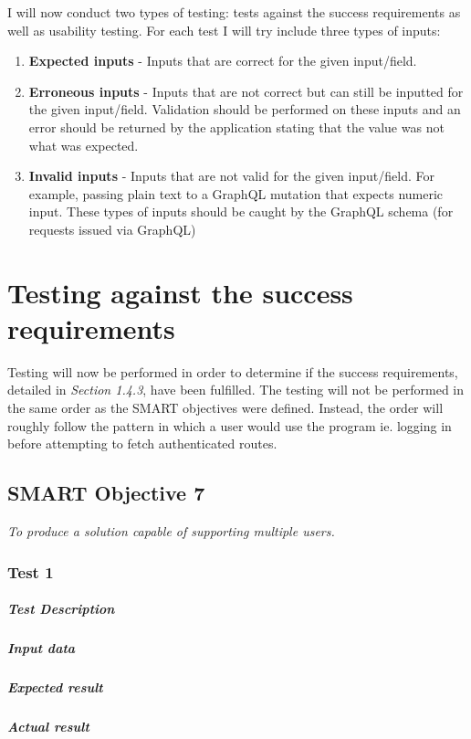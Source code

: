 \documentclass[../main.tex]{subfiles}
\begin{document}
\noindent I will now conduct two types of testing: tests against the success requirements as
well as usability testing. For each test I will try include three types
of inputs:

\begin{enumerate}
    \item \textbf{Expected inputs} - Inputs that are correct for the given input/field.
    \item \textbf{Erroneous inputs} - Inputs that are not correct but can still be inputted
          for the given input/field. Validation should be performed on these inputs and an error
          should be returned by the application stating that the value was not what was expected.
    \item \textbf{Invalid inputs} - Inputs that are not valid for the given input/field.
          For example, passing plain text to a GraphQL mutation that expects numeric input.
          These types of inputs should be caught by the GraphQL schema (for requests issued via
          GraphQL)
\end{enumerate}

\section{Testing against the success requirements}

\noindent Testing will now be performed in order to determine if the success requirements,
detailed in \textit{Section 1.4.3}, have been fulfilled. The testing
will not be performed in the same order as the SMART objectives were defined. Instead, the
order will roughly follow the pattern in which a user would use the program ie. logging in
before attempting to fetch authenticated routes.

\subsection{SMART Objective 7}

\textit{To produce a solution capable of supporting multiple users.}

\subsubsection{Test 1}

\subparagraph{Test Description}
\subparagraph{Input data}
\subparagraph{Expected result}
\subparagraph{Actual result}
\end{document}
